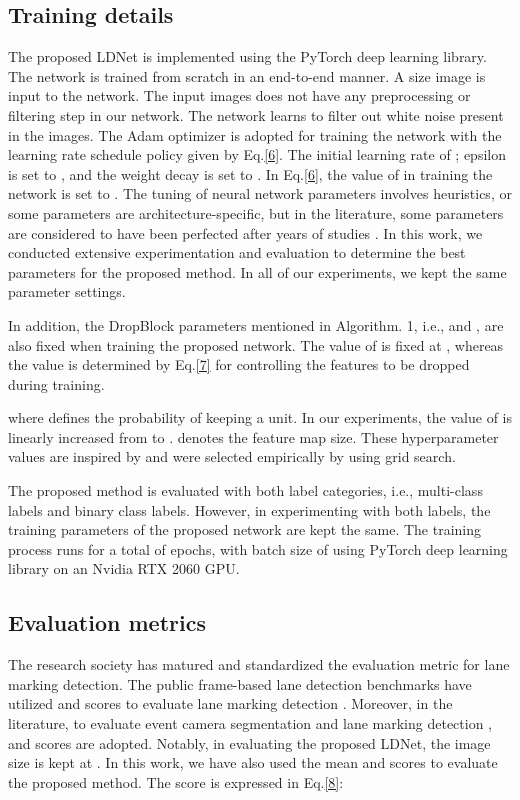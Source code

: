 \documentclass[journal]{IEEEtran}
\begin{document}
\subsection{Training details}
The proposed LDNet is implemented using the PyTorch deep learning library. The network is trained from scratch in an end-to-end manner. A  size image is input to the network. The input images does not have any preprocessing or filtering step in our network. The network learns to filter out white noise present in the images.  
The Adam optimizer is adopted for training the network with the learning rate schedule policy given by Eq.\ref{6}. The initial learning rate of ; epsilon is set to , and the weight decay is set to . In Eq.\ref{6}, the value of  in training the network is set to . The tuning of neural network parameters involves heuristics, or some parameters are architecture-specific, but in the literature, 
some parameters are considered to have been perfected after years of studies
. In this work, we conducted extensive experimentation and evaluation to determine the best parameters for the proposed method. In all of our experiments, we kept the same parameter settings.
 
\par
In addition, the DropBlock parameters mentioned in Algorithm. 1, i.e.,  and , are also fixed when training the proposed network. The value of  is fixed at , whereas the  value is determined by Eq.\ref{7} for controlling the features to be dropped during training.


where  defines the probability of keeping a unit. In our experiments, the value of  is linearly increased from  to .  denotes the feature map size. These hyperparameter values are inspired by \cite{DB} and were selected empirically by using grid search. 

The proposed method is evaluated with both label categories, i.e., multi-class labels and binary class labels. However, in experimenting with both labels, the training parameters of the proposed network are kept the same. The training process runs for a total of  epochs, with batch size of  using PyTorch deep learning library on an Nvidia RTX 2060 GPU.











\subsection{Evaluation metrics}
\label{marker}
The research society has matured and standardized the evaluation metric for lane marking detection. The public frame-based lane detection benchmarks have utilized  and  scores to evaluate lane marking detection \cite{2} \cite{3}. Moreover, in the literature, to evaluate event camera segmentation \cite{EVnet} and lane marking detection \cite{Cheng2019},  and  scores are adopted. Notably, in evaluating the proposed LDNet, the image size is kept at . In this work, we have also used the mean  and  scores to evaluate the proposed method. The  score is expressed in Eq.\ref{8}: \\
\end{document}
